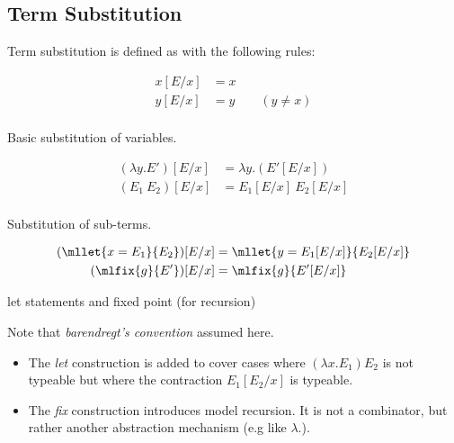\subsection{Term Substitution}
Term substitution is defined as with the following rules:
\\ \begin{minipage}[t]{.5\textwidth}
    \[\begin{split}
        x[E/x] &= x \\
        y[E/x] &= y \qquad (y \neq x) \\
    \end{split}\]
    \centerline{Basic substitution of variables.}
\end{minipage}
\begin{minipage}[t]{.5\textwidth}
    \[\begin{split}
        (\lambda y . E')[E/x] &= \lambda y.(E'[E/x]) \\
        (E_1 \ E_2)[E/x] &= E_1[E/x] \ E_2[E/x] \\
    \end{split}\]
    \centerline{Substitution of sub-terms.}
\end{minipage}
\vspace{5mm}
\[\begin{split}
    (\mllet{x = E_1}{E_2})[E/x] &= \mllet{y = E_1[E/x]}{E_2[E/x]} \\
    (\mlfix{g}{E'})[E/x] &= \mlfix{g}{E'[E/x]} \\
\end{split}\]
\centerline{let statements and fixed point (for recursion)}
Note that \textit{barendregt's convention} assumed here.
\begin{itemize}
    \item The \textit{let} construction is added to cover cases where $(\lambda x . E_1) E_2$ is not typeable but where the contraction $E_1[E_2/x]$ is typeable.
    \item The \textit{fix} construction introduces model recursion. It is not a combinator, but rather another abstraction mechanism (e.g like $\lambda . $).
\end{itemize}

